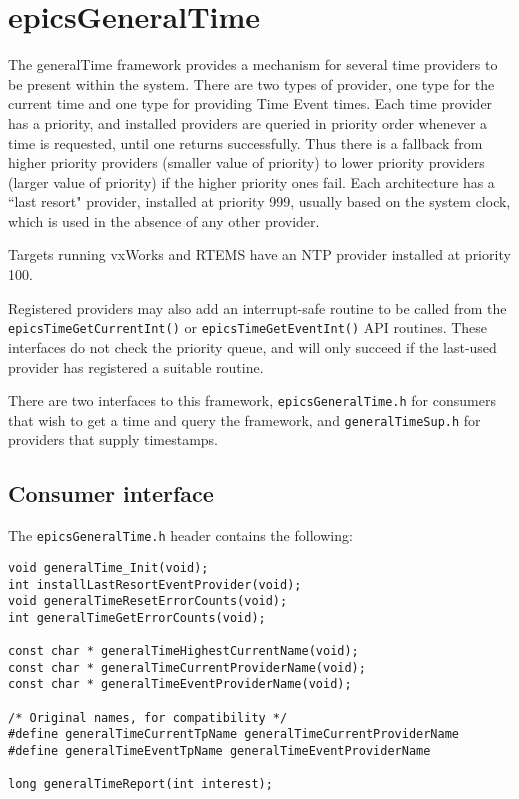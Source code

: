 \section{epicsGeneralTime}

The generalTime framework provides a mechanism for several time providers to be present within the system.
There are two types of provider, one type for the current time and one type for providing Time Event times.
Each time provider has a priority, and installed providers are queried in priority order whenever a time is requested, until one returns successfully.
Thus there is a fallback from higher priority providers (smaller value of priority) to lower priority providers (larger value 
of priority) if the higher priority ones fail.
Each architecture has a ``last resort" provider, installed at priority 999, usually based on the system clock, which is used in the absence of any other provider.

Targets running vxWorks and RTEMS have an NTP provider installed at priority 100.

Registered providers may also add an interrupt-safe routine to be called from the \verb|epicsTimeGetCurrentInt()| or \verb|epicsTimeGetEventInt()| API routines.
These interfaces do not check the priority queue, and will only succeed if the last-used provider has registered a suitable routine.

There are two interfaces to this framework, \verb|epicsGeneralTime.h| for consumers that wish to get a time and query the 
framework, and \verb|generalTimeSup.h| for providers that supply timestamps.

\subsection{Consumer interface}

The \verb|epicsGeneralTime.h| header contains the following:

\begin{verbatim}
void generalTime_Init(void);
int installLastResortEventProvider(void);
void generalTimeResetErrorCounts(void);
int generalTimeGetErrorCounts(void);

const char * generalTimeHighestCurrentName(void);
const char * generalTimeCurrentProviderName(void);
const char * generalTimeEventProviderName(void);

/* Original names, for compatibility */
#define generalTimeCurrentTpName generalTimeCurrentProviderName
#define generalTimeEventTpName generalTimeEventProviderName

long generalTimeReport(int interest);
\end{verbatim}

